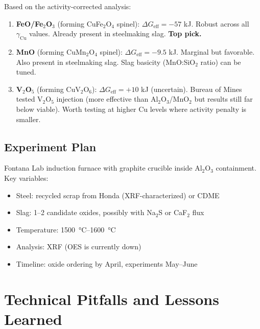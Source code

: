 \documentclass[11pt]{article}
\begin{document}
Based on the activity-corrected analysis:

\begin{enumerate}[leftmargin=*]
    \item \textbf{FeO/Fe$_2$O$_3$} (forming CuFe$_2$O$_4$ spinel): $\Delta G_{\text{eff}} = -57$ kJ. Robust across all $\gamma_{\text{Cu}}$ values. Already present in steelmaking slag. \textbf{Top pick.}

    \item \textbf{MnO} (forming CuMn$_2$O$_4$ spinel): $\Delta G_{\text{eff}} = -9.5$ kJ. Marginal but favorable. Also present in steelmaking slag. Slag basicity (MnO:SiO$_2$ ratio) can be tuned.

    \item \textbf{V$_2$O$_5$} (forming CuV$_2$O$_6$): $\Delta G_{\text{eff}} = +10$ kJ (uncertain). Bureau of Mines tested V$_2$O$_5$ injection (more effective than Al$_2$O$_3$/MnO$_2$ but results still far below viable). Worth testing at higher Cu levels where activity penalty is smaller.
\end{enumerate}

\subsection{Experiment Plan}

Fontana Lab induction furnace with graphite crucible inside Al$_2$O$_3$ containment. Key variables:
\begin{itemize}[leftmargin=*]
    \item Steel: recycled scrap from Honda (XRF-characterized) or CDME
    \item Slag: 1--2 candidate oxides, possibly with Na$_2$S or CaF$_2$ flux
    \item Temperature: \SI{1500}{\celsius}--\SI{1600}{\celsius}
    \item Analysis: XRF (OES is currently down)
    \item Timeline: oxide ordering by April, experiments May--June
\end{itemize}


\section{Technical Pitfalls and Lessons Learned}
\end{document}
